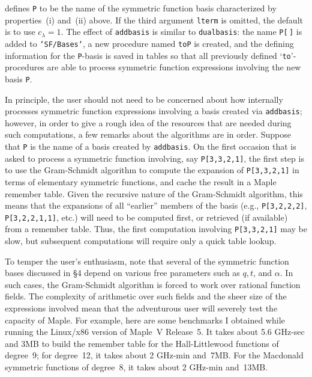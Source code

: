 
\noindent defines {\tt P} to be the name of the symmetric function basis
characterized by properties~(i) and~(ii) above. If the third argument
{\tt lterm} is omitted, the default is to use $c_\lambda=1$. The effect
of {\tt add\ul{}basis} is similar to {\tt dual\ul{}basis}: the name
{\tt P[$\,$]} is added to {\tt `SF/Bases`}, a new procedure named
{\tt toP} is created, and the defining information for the {\tt P}-basis
is saved in tables so that all previously defined `{\tt to}'-procedures
are able to process symmetric function expressions involving the new
basis {\tt P}.

In principle, the user should not need to be concerned about how \SF{}
internally processes symmetric function expressions involving a basis
created via {\tt add\ul{}basis}; however, in order to give a rough idea of
the resources that are needed during such computations, a few remarks about
the algorithms are in order. Suppose that {\tt P} is the name of a basis
created by {\tt add\ul{}basis}. On the first occasion that \SF{} is asked
to process a symmetric function involving, say {\tt P[3,3,2,1]}, the first
step is to use the Gram-Schmidt algorithm to compute the expansion
of {\tt P[3,3,2,1]} in terms of elementary symmetric functions,
and cache the result in a Maple remember table. Given the recursive
nature of the Gram-Schmidt algorithm, this means that the expansions
of all ``earlier'' members of the basis (e.g., {\tt P[3,2,2,2]},
{\tt P[3,2,2,1,1]}, etc.) will need to be computed first, or retrieved
(if available) from a remember table. Thus, the first computation
involving {\tt P[3,3,2,1]} may be slow, but subsequent computations will
require only a quick table lookup.

To temper the user's enthusiasm, note that several of the symmetric
function bases discussed in \S4 depend on various free parameters such
as $q,t$, and $\alpha$. In such cases, the Gram-Schmidt algorithm is
forced to work over rational function fields. The complexity of arithmetic
over such fields and the sheer size of the expressions involved mean that
the adventurous user will severely test the capacity of Maple.
For example, here are some benchmarks I obtained while running the
Linux/x86 version of Maple~V Release~5. It takes about 5.6 GHz-sec
and 3MB to build the remember table for the Hall-Littlewood functions
of degree~9; for degree~12, it takes about 2 GHz-min and~7MB.
For the Macdonald symmetric functions of degree~8, it takes about
2 GHz-min and~13MB.

